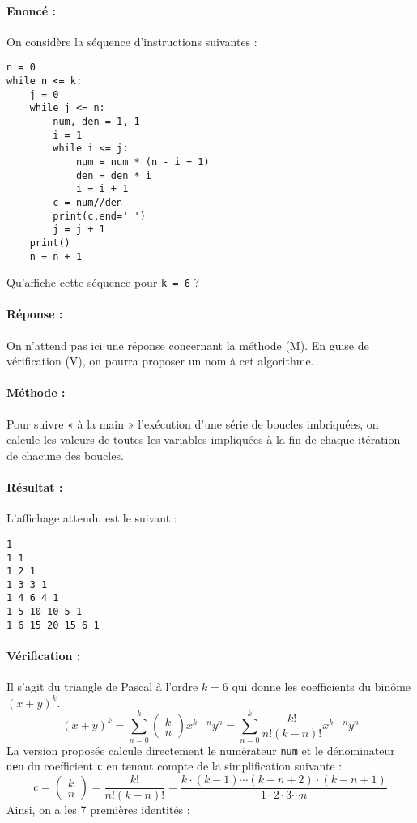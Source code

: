 \documentclass[11pt,a4paper]{article}
\begin{document}
\paragraph{Enoncé :}
On considère la séquence d'instructions suivantes :

\begin{lstlisting}
n = 0
while n <= k:
    j = 0
    while j <= n:
        num, den = 1, 1
        i = 1
        while i <= j:
            num = num * (n - i + 1)
            den = den * i
            i = i + 1
        c = num//den
        print(c,end=' ')
        j = j + 1
    print()
    n = n + 1
\end{lstlisting}
\vspace*{3mm}

\noindent Qu'affiche cette séquence pour \texttt{k = 6} ?

\paragraph{Réponse :} On n'attend pas ici une réponse concernant la méthode (M).
En guise de vérification (V), on pourra proposer un nom à cet algorithme.

\paragraph{Méthode :}
Pour suivre « à la main » l'exécution d'une série de boucles imbriquées, 
on calcule les valeurs de toutes les variables impliquées à la fin de chaque itération
de chacune des boucles.

\paragraph{Résultat :}
L'affichage attendu est le suivant :
\begin{Verbatim}
1 
1 1 
1 2 1 
1 3 3 1 
1 4 6 4 1 
1 5 10 10 5 1 
1 6 15 20 15 6 1 
\end{Verbatim}

\paragraph{Vérification :}
Il s'agit du triangle de Pascal à l'ordre $k=6$ qui donne les coefficients du binôme $(x+y)^k$.
$$(x+y)^k = \sum_{n=0}^k \left(\begin{array}{c}k\\n\end{array}\right)x^{k-n}y^n = 
\sum_{n=0}^k \frac{k!}{n!(k-n)!}x^{k-n}y^n$$
La version proposée calcule directement le numérateur \texttt{num} et le dénominateur \texttt{den}
du coefficient \texttt{c} en tenant compte de la simplification suivante :
$$c = \left(\begin{array}{c}k\\n\end{array}\right) = \frac{k!}{n!(k-n)!} =
\frac{k\cdot(k-1)\cdots(k-n+2)\cdot(k-n+1)}{1\cdot 2\cdot 3\cdots n}$$
Ainsi, on a les 7 premières identités :
\end{document}
